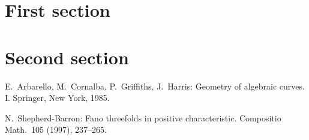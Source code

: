 \documentclass[12pt,a4paper]{article}
\begin{document}
\section{First section}
\section{Second section}
\pagebreak
\begin{thebibliography}{ccccc}

E.\ Arbarello, M.\ Cornalba, P.\ Griffiths, J.\ Harris:
Geometry of algebraic curves. I.
Springer, New York, 1985.

N.\ Shepherd-Barron:
Fano threefolds in positive characteristic.
Compositio Math.\  105  (1997),  237--265.
\end{thebibliography}
\end{document}
